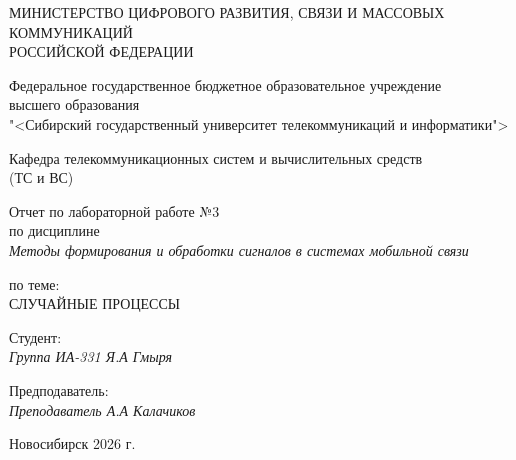 \thispagestyle{empty}

\begin{center}
    МИНИСТЕРСТВО ЦИФРОВОГО РАЗВИТИЯ, СВЯЗИ И МАССОВЫХ КОММУНИКАЦИЙ \\ РОССИЙСКОЙ ФЕДЕРАЦИИ

    \vspace{20pt}

    Федеральное государственное бюджетное образовательное учреждение  \\  высшего образования \\
    "<Сибирский государственный университет телекоммуникаций и информатики"> \\

    \vspace{20pt}

    Кафедра телекоммуникационных систем и вычислительных средств \\  (ТС и ВС)
\end{center}

\vfill

\begin{center}
    Отчет по лабораторной работе №3 \\  
    по дисциплине \\
    \textit{Методы формирования и обработки сигналов в системах мобильной связи}

    \vspace{20pt}

    по теме: \\
    \uppercase{Случайные процессы}
\end{center}

\vfill

    \noindent Студент: \\
    \textit{Группа ИА-331 \hfill Я.А Гмыря}

    \vspace{20pt}

    \noindent Предподаватель: \\
    \textit{Преподаватель \hfill А.А Калачиков}

\vfill

\begin{center}
    Новосибирск 2026 г.
\end{center}